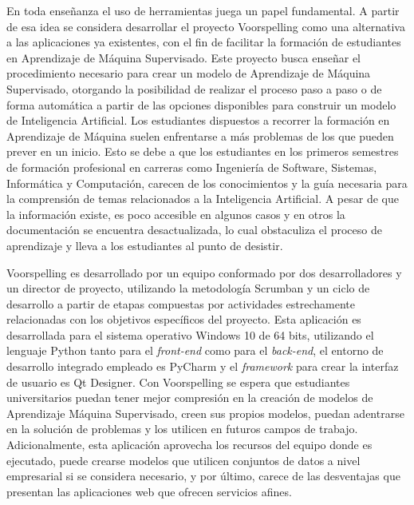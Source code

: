 En toda enseñanza el uso de herramientas juega un papel fundamental. A partir de esa idea se considera desarrollar el proyecto Voorspelling como una alternativa a las aplicaciones ya existentes, con el fin de facilitar la formación de estudiantes en Aprendizaje de Máquina Supervisado. Este proyecto busca enseñar el procedimiento necesario para crear un modelo de Aprendizaje de Máquina Supervisado, otorgando la posibilidad de realizar el proceso paso a paso o de forma automática a partir de las opciones disponibles para construir un modelo de Inteligencia Artificial. Los estudiantes dispuestos a recorrer la formación en Aprendizaje de Máquina suelen enfrentarse a más problemas de los que pueden prever en un inicio. Esto se debe a que los estudiantes en los primeros semestres de formación profesional en carreras como Ingeniería de Software, Sistemas, Informática y Computación, carecen de los conocimientos y la guía necesaria para la comprensión de temas relacionados a la Inteligencia Artificial. A pesar de que la información existe, es poco accesible en algunos casos y en otros la documentación se encuentra desactualizada, lo cual obstaculiza el proceso de aprendizaje y lleva a los estudiantes al punto de desistir.

Voorspelling es desarrollado por un equipo conformado por dos desarrolladores y un director de proyecto, utilizando la metodología Scrumban y un ciclo de desarrollo a partir de etapas compuestas por actividades estrechamente relacionadas con los objetivos específicos del proyecto. Esta aplicación es desarrollada para el sistema operativo Windows 10 de 64 bits, utilizando el lenguaje Python tanto para el \textit{front-end} como para el \textit{back-end}, el entorno de desarrollo integrado empleado es PyCharm y el \textit{framework} para crear la interfaz de usuario es Qt Designer. Con Voorspelling se espera que estudiantes universitarios puedan tener mejor compresión en la creación de modelos de Aprendizaje Máquina Supervisado, creen sus propios modelos, puedan adentrarse en la solución de problemas y los utilicen en futuros campos de trabajo. Adicionalmente, esta aplicación aprovecha los recursos del equipo donde es ejecutado, puede crearse modelos que utilicen conjuntos de datos a nivel empresarial si se considera necesario, y por último, carece de las desventajas que presentan las aplicaciones web que ofrecen servicios afines.

